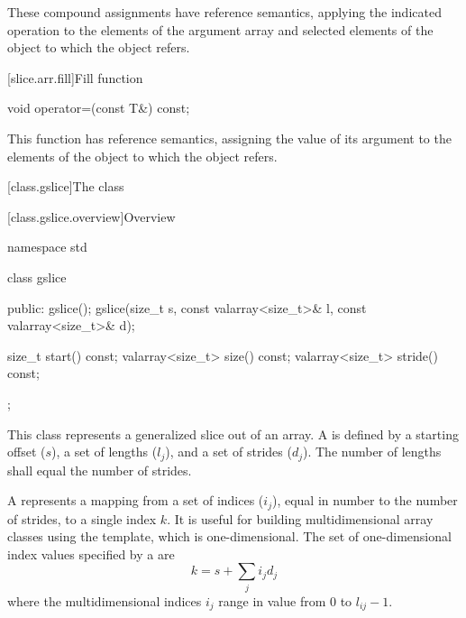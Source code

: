 \begin{itemdescr}
\pnum
These compound assignments have reference semantics, applying the
indicated operation to the elements of the argument array
and selected elements of the
object to which the
object refers.
\end{itemdescr}

[slice.arr.fill]{Fill function}

%
\begin{itemdecl}
void operator=(const T&) const;
\end{itemdecl}

\begin{itemdescr}
\pnum
This function has reference semantics, assigning the value of its argument
to the elements of the
object to which the
object refers.
\end{itemdescr}

[class.gslice]{The  class}

[class.gslice.overview]{Overview}

%
\begin{codeblock}
namespace std {
  class gslice {
  public:
    gslice();
    gslice(size_t s, const valarray<size_t>& l, const valarray<size_t>& d);

    size_t           start() const;
    valarray<size_t> size() const;
    valarray<size_t> stride() const;
  };
}
\end{codeblock}

\pnum
This class represents a generalized slice out of an array.
A
is defined by a starting offset ($s$),
a set of lengths ($l_j$),
and a set of strides ($d_j$).
The number of lengths shall equal the number of strides.

\pnum
A
represents a mapping from a set of indices ($i_j$),
equal in number to the number of strides, to a single index $k$.
It is useful for building multidimensional array classes using
the
template, which is one-dimensional.
The set of one-dimensional index values specified by a  are
\[ k = s + \sum_j i_j d_j \]
where the multidimensional indices $i_j$ range in value from
0 to $l_{ij} - 1$.

